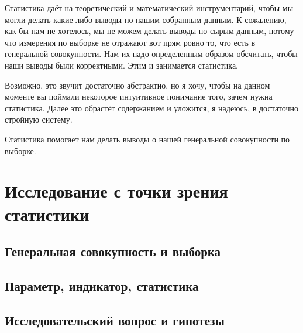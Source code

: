 \documentclass[
  letterpaper,
  DIV=11,
  numbers=noendperiod]{scrreprt}
\theoremstyle{definition}
\theoremstyle{remark}
\begin{document}
Статистика даёт на теоретический и математический инструментарий, чтобы
мы могли делать какие-либо выводы по нашим собранным данным. К
сожалению, как бы нам не хотелось, мы не можем делать выводы по сырым
данным, потому что измерения по выборке не отражают вот прям ровно то,
что есть в генеральной совокупности. Нам их надо определенным образом
обсчитать, чтобы наши выводы были корректными. Этим и занимается
статистика.

Возможно, это звучит достаточно абстрактно, но я хочу, чтобы на данном
моменте вы поймали некоторое интуитивное понимание того, зачем нужна
статистика. Далее это обрастёт содержанием и уложится, я надеюсь, в
достаточно стройную систему.

\begin{tcolorbox}[enhanced jigsaw, leftrule=.75mm, bottomtitle=1mm, left=2mm, opacitybacktitle=0.6, breakable, coltitle=black, titlerule=0mm, colbacktitle=quarto-callout-warning-color!10!white, toprule=.15mm, opacityback=0, bottomrule=.15mm, colframe=quarto-callout-warning-color-frame, title=\textcolor{quarto-callout-warning-color}{\faExclamationTriangle}\hspace{0.5em}{Важно}, toptitle=1mm, colback=white, rightrule=.15mm, arc=.35mm]

Статистика помогает нам делать выводы о нашей генеральной совокупности
по выборке.

\end{tcolorbox}

\section{Исследование с точки зрения статистики}\label{stats-research}

\subsection{Генеральная совокупность и
выборка}\label{stats-population-sample}

\subsection{Параметр, индикатор, статистика}\label{stats-parameters}

\subsection{Исследовательский вопрос и гипотезы}\label{stats-hypotheses}
\end{document}

